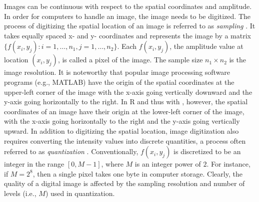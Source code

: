 Images can be continuous with respect to the spatial coordinates and amplitude. In order for computers to handle an image, the image needs to be digitized.
The process of digitizing the spatial location of an image is referred to as \emph{sampling} \citep{gonzalez2018digital}. It takes equally spaced x- and y- coordinates and represents the image by a matrix \(\{f(x_i, y_j): i = 1, \ldots, n_1, j = 1, \ldots, n_2 \}\). Each \(f(x_i, y_j)\), the amplitude value at location \((x_i, y_j)\), is called a pixel of the image. The sample size \(n_1 \times n_2\) is the image resolution. It is noteworthy that popular image processing software programs (e.g., MATLAB) have the origin of the spatial coordinates at the upper-left corner of the image with the x-axis going vertically downward and the y-axis going horizontally to the right. In R and thus with , however, the spatial coordinates of an image have their origin at the lower-left corner of the image, with the x-axis going horizontally to the right and the y-axis going vertically upward. In addition to digitizing the spatial location, image digitization also requires converting the intensity values into discrete quantities, a process often referred to as \emph{quantization} \citep{qiu2005image}. Conventionally, \(f(x_i, y_j)\) is discretized to be an integer in the range \([0, M - 1]\), where \(M\) is an integer power of \(2\). For instance, if \(M = 2^8\), then a single pixel takes one byte in computer storage. Clearly, the quality of a digital image is affected by the sampling resolution and number of levels (i.e., \(M\)) used in quantization.

